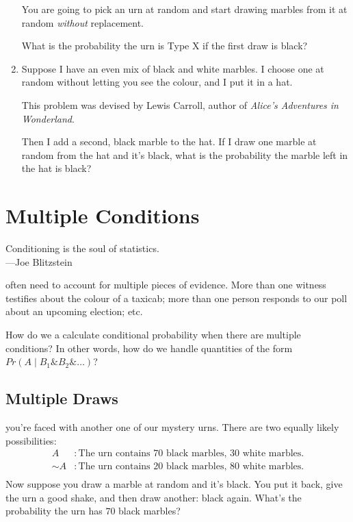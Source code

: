 \documentclass[justified]{tufte-book}
\newcommand{\given}{\mid}
\renewcommand{\neg}{\mathbin{\sim}}
\renewcommand{\wedge}{\mathbin{\&}}
\newcommand{\p}{Pr}
\newenvironment{epigraph}%
{
\begin{flushright}    
\begin{minipage}{20em}
\begin{flushright}
\itshape
}%
{
\end{flushright}
\end{minipage}
\end{flushright}
}
\theoremstyle{definition}
\theoremstyle{definition}
\theoremstyle{definition}
\theoremstyle{remark}
\begin{document}
\begin{enumerate}
  You are going to pick an urn at random and start drawing marbles from it at random \emph{without} replacement.

  What is the probability the urn is Type X if the first draw is black?
\item
  Suppose I have an even mix of black and white marbles. I choose one at random without letting you see the colour, and I put it in a hat.

  \begin{marginfigure}
  This problem was devised by Lewis Carroll, author of \emph{Alice's
  Adventures in Wonderland}.
  \end{marginfigure}

  Then I add a second, black marble to the hat. If I draw one marble at random from the hat and it's black, what is the probability the marble left in the hat is black?
\end{enumerate}

\hypertarget{multiple-conditions}{%
\chapter{Multiple Conditions}\label{multiple-conditions}}

\begin{epigraph}
Conditioning is the soul of statistics.\\
---Joe Blitzstein
\end{epigraph}

 often need to account for multiple pieces of evidence. More than one witness testifies about the colour of a taxicab; more than one person responds to our poll about an upcoming election; etc.

How do we a calculate conditional probability when there are multiple conditions? In other words, how do we handle quantities of the form \(\p(A \given B_1 \wedge B_2 \wedge \ldots)\)?

\hypertarget{multiple-draws}{%
\section{Multiple Draws}\label{multiple-draws}}

 you're faced with another one of our mystery urns. There are two equally likely possibilities:
\[
  \begin{aligned}
    A      &: \mbox{The urn contains $70$ black marbles, $30$ white marbles.}\\
    \neg A &: \mbox{The urn contains $20$ black marbles, $80$ white marbles.}\\
  \end{aligned}
\]
Now suppose you draw a marble at random and it's black. You put it back, give the urn a good shake, and then draw another: black again. What's the probability the urn has \(70\) black marbles?
\end{document}

